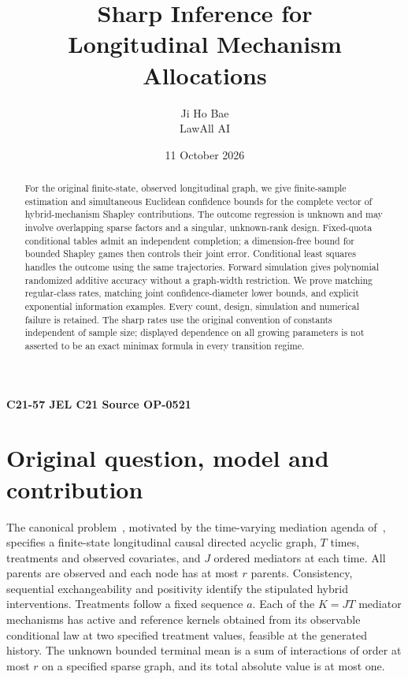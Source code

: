 \documentclass[11pt,a4paper]{article}
\title{Sharp Inference for\\Longitudinal Mechanism Allocations}
\author{Ji Ho Bae\\\small LawAll AI}
\date{11 October 2026}
\numberwithin{equation}{section}
\theoremstyle{definition}
\begin{document}
\maketitle
\begin{center}
\small\textbf{C21-57 \quad JEL C21 \quad Source OP-0521}
\end{center}
\begin{abstract}
For the original finite-state, observed longitudinal graph, we give
finite-sample estimation and simultaneous Euclidean confidence bounds for
the complete vector of hybrid-mechanism Shapley contributions. The outcome
regression is unknown and may involve overlapping sparse factors and a
singular, unknown-rank design. Fixed-quota conditional tables admit an
independent completion; a dimension-free bound for bounded Shapley games
then controls their joint error. Conditional least squares handles the
outcome using the same trajectories. Forward simulation gives polynomial
randomized additive accuracy without a graph-width restriction. We prove
matching regular-class rates, matching joint confidence-diameter lower
bounds, and explicit exponential information examples. Every count,
design, simulation and numerical failure is retained. The sharp rates
use the original convention of constants independent of sample size;
displayed dependence on all growing parameters is not asserted to be an
exact minimax formula in every transition regime.
\end{abstract}

\section{Original question, model and contribution}\label{sec:model}

The canonical problem~\cite{catalogue}, motivated by the time-varying
mediation agenda of~\cite[Section 3.4.3]{agenda}, specifies a finite-state
longitudinal causal directed acyclic graph, $T$ times, treatments and
observed covariates, and $J$ ordered mediators at each time. All parents
are observed and each node has at most $r$ parents. Consistency,
sequential exchangeability and positivity identify the stipulated hybrid
interventions. Treatments follow a fixed sequence $a$. Each of the
$K=JT$ mediator mechanisms has active and reference kernels obtained
from its observable conditional law at two specified treatment values,
feasible at the generated history. The unknown bounded terminal mean
is a sum of interactions of order at most $r$ on a specified sparse graph,
and its total absolute value is at most one.
\end{document}
